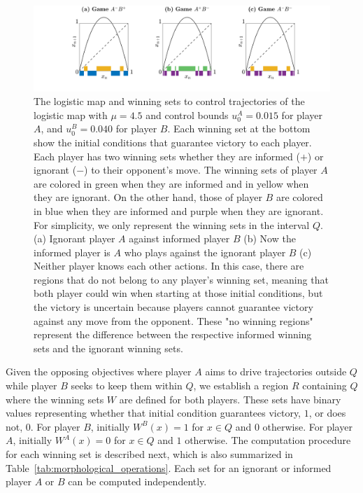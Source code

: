 \begin{figure}[h!]
    \centering
   \includegraphics[trim={3.2cm 0cm 0cm 0cm}, clip,width=1.1\textwidth ]{Images/P5/sets_juego.png}
    \caption{The logistic map and winning sets to control trajectories of the logistic map with $\mu = 4.5$ and control bounds $u^A_0 = 0.015$ for player $A$, and $u^B_0 = 0.040$ for player $B$. Each winning set at the bottom show the initial conditions that guarantee victory to each player. Each player has two winning sets whether they are informed ($+$) or ignorant ($-$) to their opponent's move. The winning sets of player $A$ are colored in green when they are informed and in yellow when they are ignorant. On the other hand, those of player $B$ are colored in blue when they are informed and purple when they are ignorant. For simplicity, we only represent the winning sets in the interval $Q$. (a) Ignorant player $A$ against informed player $B$ (b) Now the informed player is $A$ who plays against the ignorant player $B$ (c) Neither player knows each other actions. In this case, there are regions that do not belong to any player's winning set, meaning that both player could win when starting at those initial conditions, but the victory is uncertain because players cannot guarantee victory against any move from the opponent. These "no winning regions" represent the difference between the respective informed winning sets and the ignorant winning sets.}
    \label{fig::sets}
\end{figure}







Given the opposing objectives where player $A$ aims to drive trajectories outside $Q$ while player $B$ seeks to keep them within $Q$, we establish a region $R$ containing $Q$ where the winning sets $W$ are defined for both players. These sets have binary values representing whether that initial condition guarantees victory, $1$, or does not, $0$. For player $B$, initially $W^B(x)=1$ for $x \in Q$ and $0$ otherwise. For player $A$, initially $W^A(x)=0$ for $x \in Q$ and $1$ otherwise. The computation procedure for each winning set is described next, which is also summarized in Table~\ref{tab:morphological_operations}. Each set for an ignorant or informed player $A$ or $B$ can be computed independently.

